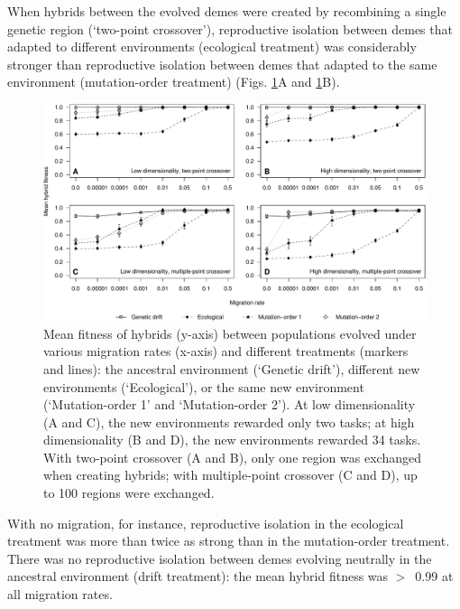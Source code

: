 \begin{doublespace}
When hybrids between the evolved demes
were created by recombining a single genetic region
(`two-point crossover'), %
reproductive isolation between demes
that adapted to different environments (ecological treatment)
was considerably stronger than
reproductive isolation between demes
that adapted to the same environment (mutation-order treatment)
(Figs. \ref{hybrid_fitness}A and \ref{hybrid_fitness}B).
%
\begin{figure}
\centering
\includegraphics[width=0.95\linewidth]{hybrid_fitness.pdf}
\caption{Mean fitness of hybrids (y-axis)
  between populations evolved under various migration rates (x-axis)
  and different treatments (markers and lines):
  the ancestral environment (`Genetic drift'),
  different new environments (`Ecological'),
  or the same new environment (`Mutation-order 1' and `Mutation-order 2').
  At low dimensionality (A and C),
  the new environments rewarded only two tasks;
  at high dimensionality (B and D),
  the new environments rewarded 34 tasks.
  With two-point crossover (A and B),
  only one region was exchanged when creating hybrids;
  with multiple-point crossover (C and D),
  up to 100 regions were exchanged.}
\label{hybrid_fitness}
\end{figure}
%
With no migration, for instance,
reproductive isolation in the ecological treatment
was more than twice as strong than in the mutation-order treatment.
%
%
There was no reproductive isolation between demes
evolving neutrally in the ancestral environment (drift treatment):
the mean hybrid fitness was $>$~0.99 at all migration rates.




\end{doublespace}
